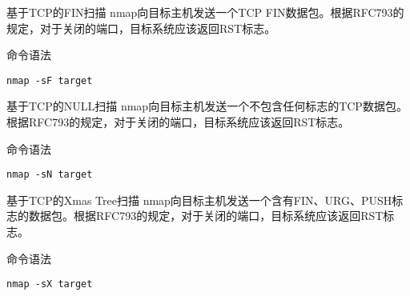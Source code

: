 \documentclass{beamer}
\begin{document}
\begin{frame}[fragile]{基于TCP的FIN扫描}
nmap向目标主机发送一个TCP FIN数据包。根据RFC793的规定，对于关闭的端口，目标系统应该返回RST标志。
\begin{block}{命令语法}
\begin{verbatim}
nmap -sF target
\end{verbatim}
\end{block}
\end{frame}

\begin{frame}[fragile]{基于TCP的NULL扫描}
nmap向目标主机发送一个不包含任何标志的TCP数据包。根据RFC793的规定，对于关闭的端口，目标系统应该返回RST标志。
\begin{block}{命令语法}
\begin{verbatim}
nmap -sN target
\end{verbatim}
\end{block}
\end{frame}

\begin{frame}[fragile]{基于TCP的Xmas Tree扫描}
nmap向目标主机发送一个含有FIN、URG、PUSH标志的数据包。根据RFC793的规定，对于关闭的端口，目标系统应该返回RST标志。
\begin{block}{命令语法}
\begin{verbatim}
nmap -sX target
\end{verbatim}
\end{block}
\end{frame}
\end{document}
